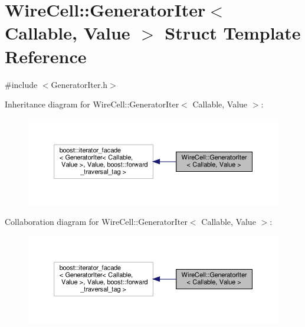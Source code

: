 \hypertarget{struct_wire_cell_1_1_generator_iter}{}\section{Wire\+Cell\+:\+:Generator\+Iter$<$ Callable, Value $>$ Struct Template Reference}
\label{struct_wire_cell_1_1_generator_iter}


{\ttfamily \#include $<$Generator\+Iter.\+h$>$}



Inheritance diagram for Wire\+Cell\+:\+:Generator\+Iter$<$ Callable, Value $>$\+:
\nopagebreak
\begin{figure}[H]
\begin{center}
\leavevmode
\includegraphics[width=350pt]{struct_wire_cell_1_1_generator_iter__inherit__graph}
\end{center}
\end{figure}


Collaboration diagram for Wire\+Cell\+:\+:Generator\+Iter$<$ Callable, Value $>$\+:
\nopagebreak
\begin{figure}[H]
\begin{center}
\leavevmode
\includegraphics[width=350pt]{struct_wire_cell_1_1_generator_iter__coll__graph}
\end{center}
\end{figure}
